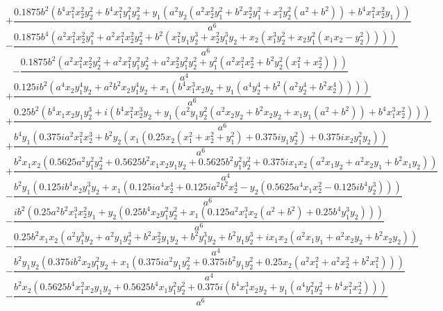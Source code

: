 $$+\frac{0.1875 b^{2} \left(b^{4} x_{1}^{2} x_{2}^{2} y_{2}^{2} + b^{4} x_{1}^{2} y_{1}^{2} y_{2}^{2} + y_{1} \left(a^{2} y_{2} \left(a^{2} x_{2}^{2} y_{1}^{2} + b^{2} x_{2}^{2} y_{1}^{2} + x_{1}^{2} y_{2}^{2} \left(a^{2} + b^{2}\right)\right) + b^{4} x_{1}^{2} x_{2}^{2} y_{1}\right)\right)}{a^{6}}$$
$$- \frac{0.1875 b^{4} \left(a^{2} x_{1}^{2} x_{2}^{2} y_{1}^{2} + a^{2} x_{1}^{2} x_{2}^{2} y_{2}^{2} + b^{2} \left(x_{1}^{2} y_{1} y_{2}^{3} + x_{2}^{2} y_{1}^{3} y_{2} + x_{2} \left(x_{1}^{3} y_{2}^{2} + x_{2} y_{1}^{2} \left(x_{1} x_{2} - y_{2}^{2}\right)\right)\right)\right)}{a^{6}}$$
$$- \frac{0.1875 b^{2} \left(a^{2} x_{1}^{2} x_{2}^{2} y_{2}^{2} + a^{2} x_{1}^{2} y_{1}^{2} y_{2}^{2} + a^{2} x_{2}^{2} y_{1}^{2} y_{2}^{2} + y_{1}^{2} \left(a^{2} x_{1}^{2} x_{2}^{2} + b^{2} y_{2}^{2} \left(x_{1}^{2} + x_{2}^{2}\right)\right)\right)}{a^{4}}$$
$$+\frac{0.125 i b^{2} \left(a^{4} x_{2} y_{1}^{4} y_{2} + a^{2} b^{2} x_{2} y_{1}^{4} y_{2} + x_{1} \left(b^{4} x_{1}^{3} x_{2} y_{2} + y_{1} \left(a^{4} y_{2}^{4} + b^{2} \left(a^{2} y_{2}^{4} + b^{2} x_{2}^{4}\right)\right)\right)\right)}{a^{6}}$$
$$+\frac{0.25 b^{2} \left(b^{4} x_{1} x_{2} y_{1} y_{2}^{3} + i \left(b^{4} x_{1}^{2} x_{2}^{3} y_{2} + y_{1} \left(a^{2} y_{1} y_{2}^{2} \left(a^{2} x_{2} y_{2} + b^{2} x_{2} y_{2} + x_{1} y_{1} \left(a^{2} + b^{2}\right)\right) + b^{4} x_{1}^{3} x_{2}^{2}\right)\right)\right)}{a^{6}}$$
$$+\frac{b^{4} y_{1} \left(0.375 i a^{2} x_{1}^{2} x_{2}^{3} + b^{2} y_{2} \left(x_{1} \left(0.25 x_{2} \left(x_{1}^{2} + x_{2}^{2} + y_{1}^{2}\right) + 0.375 i y_{1} y_{2}^{2}\right) + 0.375 i x_{2} y_{1}^{2} y_{2}\right)\right)}{a^{6}}$$
$$+\frac{b^{2} x_{1} x_{2} \left(0.5625 a^{2} y_{1}^{2} y_{2}^{2} + 0.5625 b^{2} x_{1} x_{2} y_{1} y_{2} + 0.5625 b^{2} y_{1}^{2} y_{2}^{2} + 0.375 i x_{1} x_{2} \left(a^{2} x_{1} y_{2} + a^{2} x_{2} y_{1} + b^{2} x_{1} y_{2}\right)\right)}{a^{4}}$$
$$- \frac{b^{2} y_{1} \left(0.125 i b^{4} x_{2} y_{1}^{3} y_{2} + x_{1} \left(0.125 i a^{4} x_{2}^{4} + 0.125 i a^{2} b^{2} x_{2}^{4} - y_{2} \left(0.5625 a^{4} x_{1} x_{2}^{2} - 0.125 i b^{4} y_{2}^{3}\right)\right)\right)}{a^{6}}$$
$$- \frac{i b^{2} \left(0.25 a^{2} b^{2} x_{1}^{3} x_{2}^{2} y_{1} + y_{2} \left(0.25 b^{4} x_{2} y_{1}^{2} y_{2}^{2} + x_{1} \left(0.125 a^{2} x_{1}^{3} x_{2} \left(a^{2} + b^{2}\right) + 0.25 b^{4} y_{1}^{3} y_{2}\right)\right)\right)}{a^{6}}$$
$$- \frac{0.25 b^{2} x_{1} x_{2} \left(a^{2} y_{1}^{3} y_{2} + a^{2} y_{1} y_{2}^{3} + b^{2} x_{2}^{2} y_{1} y_{2} + b^{2} y_{1}^{3} y_{2} + b^{2} y_{1} y_{2}^{3} + i x_{1} x_{2} \left(a^{2} x_{1} y_{1} + a^{2} x_{2} y_{2} + b^{2} x_{2} y_{2}\right)\right)}{a^{4}}$$
$$- \frac{b^{2} y_{1} y_{2} \left(0.375 i b^{2} x_{2} y_{1}^{2} y_{2} + x_{1} \left(0.375 i a^{2} y_{1} y_{2}^{2} + 0.375 i b^{2} y_{1} y_{2}^{2} + 0.25 x_{2} \left(a^{2} x_{1}^{2} + a^{2} x_{2}^{2} + b^{2} x_{1}^{2}\right)\right)\right)}{a^{4}}$$
$$- \frac{b^{2} x_{2} \left(0.5625 b^{4} x_{1}^{2} x_{2} y_{1} y_{2} + 0.5625 b^{4} x_{1} y_{1}^{2} y_{2}^{2} + 0.375 i \left(b^{4} x_{1}^{3} x_{2} y_{2} + y_{1} \left(a^{4} y_{1}^{2} y_{2}^{2} + b^{4} x_{1}^{2} x_{2}^{2}\right)\right)\right)}{a^{6}}$$

